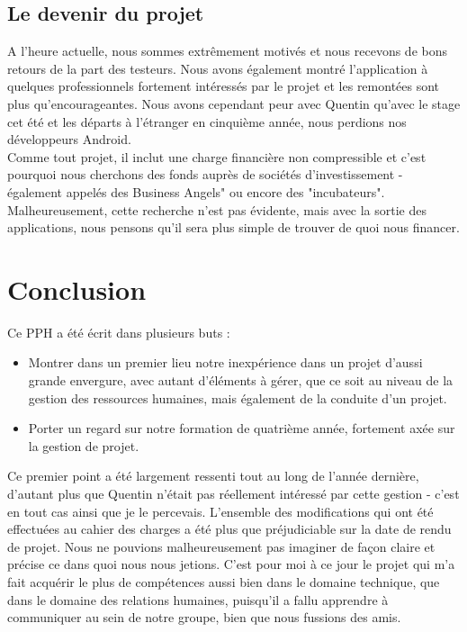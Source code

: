 \documentclass{article}
\begin{document}
	\subsection{Le devenir du projet}
	A l'heure actuelle, nous sommes extrêmement motivés et nous recevons de bons retours de la part des testeurs. Nous avons également montré l'application à quelques professionnels fortement intéressés par le projet et les remontées sont plus qu'encourageantes.  Nous avons cependant peur avec Quentin qu'avec le stage cet été et les départs à l'étranger en cinquième année, nous perdions nos développeurs Android. \\
	
	Comme tout projet, il inclut une charge financière non compressible et c'est pourquoi nous cherchons des fonds auprès de sociétés d'investissement - également appelés des Business Angels" ou encore des "incubateurs". Malheureusement, cette recherche n’est pas évidente, mais avec la sortie des applications, nous pensons qu’il sera plus simple de trouver de quoi nous financer.  
	
	
\section{Conclusion}

		Ce PPH a été écrit dans plusieurs buts : 
		\begin{itemize}
			\item Montrer dans un premier lieu notre inexpérience dans un projet d'aussi grande envergure, avec autant d'éléments à gérer, que ce soit au niveau de la gestion des ressources humaines, mais également de la conduite d'un projet.
			\item Porter un regard sur notre formation de quatrième année, fortement axée sur la gestion de projet. \\
		\end{itemize}
		
		Ce premier point a été largement ressenti tout au long de l'année dernière, d'autant plus que Quentin n'était pas réellement intéressé par cette gestion - c'est en tout cas ainsi que je le percevais. L'ensemble des modifications qui ont été effectuées au cahier des charges a été plus que préjudiciable sur la date de rendu de projet. Nous ne pouvions malheureusement pas imaginer de façon claire et précise ce dans quoi nous nous jetions. C'est pour moi à ce jour le projet qui m'a fait acquérir le plus de compétences aussi bien dans le domaine technique, que dans le domaine des relations humaines, puisqu'il a fallu apprendre à communiquer au sein de notre groupe, bien que nous fussions des amis. \\
		
\end{document}
